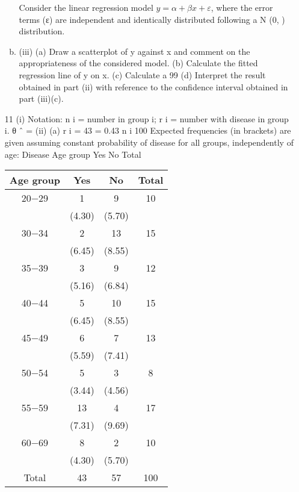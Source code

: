 \documentclass[a4paper,12pt]{article}
\begin{document}
\begin{enumerate}
\begin{enumerate}[(a)]
Consider the linear regression model $y = \alpha + \beta x + \varepsilon $, where the error terms (ε) are
independent and identically distributed following a N (0,  ) distribution.
\item (iii)
(a) Draw a scatterplot of y against x and comment on the appropriateness
of the considered model.
(b) Calculate the fitted regression line of y on x.
(c) Calculate a 99%
(d) Interpret the result obtained in part (ii) with reference to the confidence
interval obtained in part (iii)(c).
\end{enumerate}
\newpage
11
(i)
Notation: n i = number in group i; r i = number with disease in group i.
θ ˆ =
(ii)
(a)
\sum r i = 43 = 0.43
\sum n i 100
Expected frequencies (in brackets) are given assuming constant
probability of disease for all groups, independently of age:
Disease
Age group Yes
No
Total
\begin{center}
\begin{tabular}{cccc}
Age group & Yes & No & Total \\ \hline
20−29 & 1 & 9 & 10 \\
& (4.30) & (5.70) & \\
30−34 & 2 & 13 & 15 \\
&(6.45)& (8.55)& \\
35−39 & 3 & 9 & 12 \\
& (5.16) & (6.84) & \\
40−44 & 5 & 10  &  15 \\
& (6.45) & (8.55) & \\ \hline
45−49 & 6 & 7 & 13 \\ 
& (5.59) & (7.41) & \\ \hline
50−54 & 5 & 3 & 8 \\
&(3.44) &(4.56)& \\ \hline
55−59 & 13 & 4 & 17 \\
      &(7.31) & (9.69) \\ \hline
60−69 & 8 & 2 &  10      \\
      &(4.30) & (5.70) & \\ \hline
Total & 43 & 57 & 100 \\ 
\end{tabular}
\end{center}


\end{enumerate}
\end{document}
